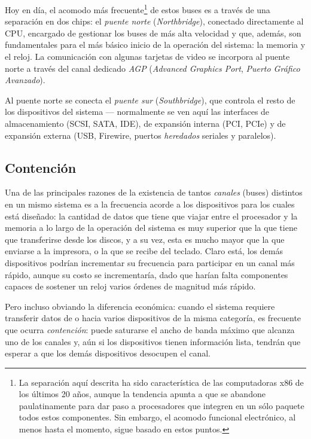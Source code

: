 \documentclass[11pt,fleqn]{book} %
\begin{document}
Hoy en día, el acomodo más frecuente\footnote{La separación aquí descrita
ha sido característica de las computadoras x86 de los últimos 20 años,
aunque la tendencia apunta a que se abandone paulatinamente para dar
paso a procesadores que integren en un sólo paquete todos estos
componentes. Sin embargo, el acomodo funcional electrónico, al menos
hasta el momento, sigue basado en estos puntos. } de estos buses es a
través de una separación en dos chips: el \emph{puente norte}
(\emph{Northbridge}), conectado directamente al CPU, encargado de gestionar
los buses de más alta velocidad y que, además, son fundamentales para
el más básico inicio de la operación del sistema: la memoria y el
reloj. La comunicación con algunas tarjetas de video se incorpora al
puente norte a través del canal dedicado \emph{AGP} (\emph{Advanced Graphics Port}, \emph{Puerto Gráfico Avanzado}).

Al puente norte se conecta el \emph{puente sur} (\emph{Southbridge}), que
controla el resto de los dispositivos del sistema — normalmente
se ven aquí las interfaces de almacenamiento (SCSI, SATA, IDE), de
expansión interna (PCI, PCIe) y de expansión externa (USB, Firewire,
puertos \emph{heredados} seriales y paralelos).
\subsection{Contención}
\label{sec-2-6-1}


Una de las principales razones de la existencia de tantos \emph{canales}
(buses) distintos en un mismo sistema es a la frecuencia acorde a los
dispositivos para los cuales está diseñado: la cantidad de datos que
tiene que viajar entre el procesador y la memoria a lo largo de la
operación del sistema es muy superior que la que tiene que
transferirse desde los discos, y a su vez, esta es mucho mayor que la
que enviarse a la impresora, o la que se recibe del teclado. Claro
está, los demás dispositivos podrían incrementar su frecuencia para
participar en un canal más rápido, aunque su costo se incrementaría,
dado que harían falta componentes capaces de sostener un reloj varios
órdenes de magnitud más rápido.

Pero incluso obviando la diferencia económica: cuando el sistema
requiere transferir datos de o hacia varios dispositivos de la misma
categoría, es frecuente que ocurra \emph{contención}: puede saturarse el
ancho de banda máximo que alcanza uno de los canales y, aún si los
dispositivos tienen información lista, tendrán que esperar a que los
demás dispositivos desocupen el canal.
\end{document}
